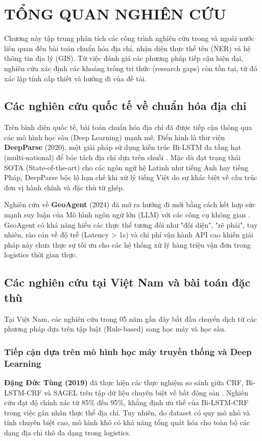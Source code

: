 \chapter{TỔNG QUAN NGHIÊN CỨU}
\label{ch:literature-review}

Chương này tập trung phân tích các công trình nghiên cứu trong và ngoài nước liên quan đến bài toán chuẩn hóa địa chỉ, nhận diện thực thể tên (NER) và hệ thông tin địa lý (GIS). Từ việc đánh giá các phương pháp tiếp cận hiện đại, nghiên cứu xác định các khoảng trống tri thức (research gaps) còn tồn tại, từ đó xác lập tính cấp thiết và hướng đi của đề tài.

\section{Các nghiên cứu quốc tế về chuẩn hóa địa chỉ}

Trên bình diện quốc tế, bài toán chuẩn hóa địa chỉ đã được tiếp cận thông qua các mô hình học sâu (Deep Learning) mạnh mẽ. Điển hình là thư viện \textbf{DeepParse} (2020), một giải pháp sử dụng kiến trúc Bi-LSTM đa tầng hạt (multi-national) để bóc tách địa chỉ dựa trên chuỗi \cite{marcoux2020deepparse}. Mặc dù đạt trạng thái SOTA (State-of-the-art) cho các ngôn ngữ hệ Latinh như tiếng Anh hay tiếng Pháp, DeepParse bộc lộ hạn chế khi xử lý tiếng Việt do sự khác biệt về cấu trúc đơn vị hành chính và đặc thù từ ghép.

Nghiên cứu về \textbf{GeoAgent} (2024) đã mở ra hướng đi mới bằng cách kết hợp sức mạnh suy luận của Mô hình ngôn ngữ lớn (LLM) với các công cụ không gian \cite{geoagent}. GeoAgent có khả năng hiểu các thực thể tương đối như "đối diện", "rẽ phải", tuy nhiên, rào cản về độ trễ (Latency > 1s) và chi phí vận hành API cao khiến giải pháp này chưa thực sự tối ưu cho các hệ thống xử lý hàng triệu vận đơn trong logistics thời gian thực.

\section{Các nghiên cứu tại Việt Nam và bài toán đặc thù}

Tại Việt Nam, các nghiên cứu trong 05 năm gần đây bắt đầu chuyển dịch từ các phương pháp dựa trên tập luật (Rule-based) sang học máy và học sâu.

\subsection{Tiếp cận dựa trên mô hình học máy truyền thống và Deep Learning}
\textbf{Đặng Đức Tùng (2019)} đã thực hiện các thực nghiệm so sánh giữa CRF, Bi-LSTM-CRF và SAGEL trên tập dữ liệu chuyên biệt về bất động sản \cite{dang2019crf}. Nghiên cứu đạt độ chính xác từ 85\% đến 95\%, khẳng định ưu thế của Bi-LSTM-CRF trong việc gán nhãn thực thể địa chỉ. Tuy nhiên, do dataset có quy mô nhỏ và tính chuyên biệt cao, mô hình khó có khả năng tổng quát hóa cho toàn bộ các dạng địa chỉ thô đa dạng trong logistics.

